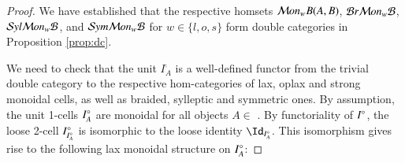 \begin{proof}
We have established that the respective homsets $\mathcal{M} on_wB(A,B)$, $\mathcal{B} r \mathcal{M} on_w\mathcal{B}$, $\mathcal{S} yl \mathcal{M} on_w\mathcal{B}$, and $\mathcal{S} ym \mathcal{M} on_w\mathcal{B}$ for $w \in \{l,o,s\}$ form double categories in Proposition \ref{prop:dc}. 

We need to check that the unit $I^{\comp}_A$ is a well-defined functor from the trivial double category to the respective hom-categories of lax, oplax and strong monoidal cells, as well as braided, sylleptic and symmetric ones. 
By assumption, the unit 1-cells $I^{\circ}_A$ are monoidal for all objects $A \in$ \fB. By functoriality of $I^{\circ}$, the loose 2-cell $I^{\circ}_{I^{\circ}_A}$ is isomorphic to the loose identity $\looseid_{\compI_A}$. This isomorphism gives rise to the following lax monoidal structure on $I^{\circ}_A$: 


\end{proof}
